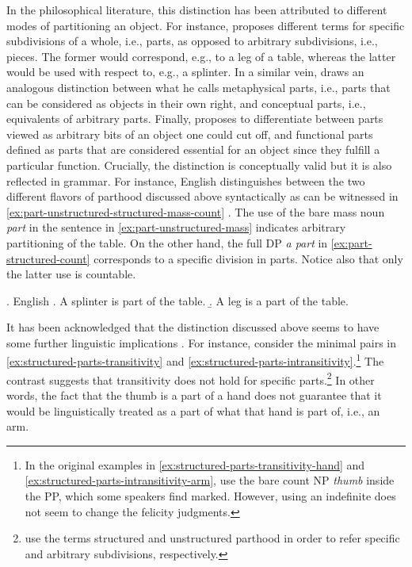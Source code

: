 In the philosophical literature, this distinction has been attributed to different modes of partitioning an object. For instance, \citet{krecz1986parts} proposes different terms for specific subdivisions of a whole, i.e., parts, as opposed to arbitrary subdivisions, i.e., pieces. The former would correspond, e.g., to a leg of a table, whereas the latter would be used with respect to, e.g., a splinter. In a similar vein, \citet{markosian1998brutal} draws an analogous distinction between what he calls metaphysical parts, i.e., parts that can be considered as objects in their own right, and conceptual parts, i.e., equivalents of arbitrary parts. Finally, \citet{jennings2010against} proposes to differentiate between parts viewed as arbitrary bits of an object one could cut off, and functional parts defined as parts that are considered essential for an object since they fulfill a particular function. Crucially, the distinction is conceptually valid but it is also reflected in grammar. For instance, English distinguishes between the two different flavors of parthood discussed above syntactically as can be witnessed in \ref{ex:part-unstructured-structured-mass-count} \citep[see also][]{champollion_krifka2016mereology}. The use of the bare mass noun \textit{part} in the sentence in \ref{ex:part-unstructured-mass} indicates arbitrary partitioning of the table. On the other hand, the full DP \textit{a part} in \ref{ex:part-structured-count} corresponds to a specific division in parts. Notice also that only the latter use is countable.

\ex. English \citep[p. 90, adapted]{acquaviva2008lexical}\label{ex:part-unstructured-structured-mass-count}
\a. A splinter is part of the table.\label{ex:part-unstructured-mass}
\b. A leg is a part of the table.\label{ex:part-structured-count} 

It has been acknowledged that the distinction discussed above seems to have some further linguistic implications \citep{champollion_krifka2016mereology}. For instance, consider the minimal pairs in \ref{ex:structured-parts-transitivity} and \ref{ex:structured-parts-intransitivity}.\footnote{In the original examples in \ref{ex:structured-parts-transitivity-hand} and \ref{ex:structured-parts-intransitivity-arm}, \citeauthor{champollion_krifka2016mereology} use the bare count NP \textit{thumb} inside the PP, which some speakers find marked. However, using an indefinite does not seem to change the felicity judgments.} The contrast suggests that transitivity does not hold for specific parts.\footnote{\citeauthor{champollion_krifka2016mereology} use the terms structured and unstructured parthood in order to refer specific and arbitrary subdivisions, respectively.} In other words, the fact that the thumb is a part of a hand does not guarantee that it would be linguistically treated as a part of what that hand is part of, i.e., an arm.   

